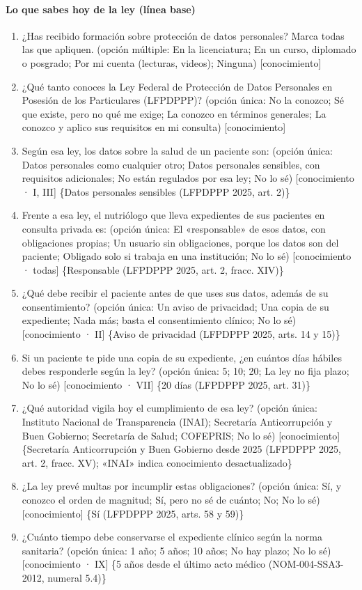 \documentclass[12pt, a4paper]{article}
\begin{document}
\paragraph{Lo que sabes hoy de la ley (línea base)}
\begin{enumerate}
  \item ¿Has recibido formación sobre protección de datos personales? Marca todas las que apliquen. (opción múltiple: En la licenciatura; En un curso, diplomado o posgrado; Por mi cuenta (lecturas, videos); Ninguna) [conocimiento]
  \item ¿Qué tanto conoces la Ley Federal de Protección de Datos Personales en Posesión de los Particulares (LFPDPPP)? (opción única: No la conozco; Sé que existe, pero no qué me exige; La conozco en términos generales; La conozco y aplico sus requisitos en mi consulta) [conocimiento]
  \item Según esa ley, los datos sobre la salud de un paciente son: (opción única: Datos personales como cualquier otro; Datos personales sensibles, con requisitos adicionales; No están regulados por esa ley; No lo sé) [conocimiento · I, III] \{Datos personales sensibles (LFPDPPP 2025, art. 2)\}
  \item Frente a esa ley, el nutriólogo que lleva expedientes de sus pacientes en consulta privada es: (opción única: El «responsable» de esos datos, con obligaciones propias; Un usuario sin obligaciones, porque los datos son del paciente; Obligado solo si trabaja en una institución; No lo sé) [conocimiento · todas] \{Responsable (LFPDPPP 2025, art. 2, fracc. XIV)\}
  \item ¿Qué debe recibir el paciente antes de que uses sus datos, además de su consentimiento? (opción única: Un aviso de privacidad; Una copia de su expediente; Nada más; basta el consentimiento clínico; No lo sé) [conocimiento · II] \{Aviso de privacidad (LFPDPPP 2025, arts. 14 y 15)\}
  \item Si un paciente te pide una copia de su expediente, ¿en cuántos días hábiles debes responderle según la ley? (opción única: 5; 10; 20; La ley no fija plazo; No lo sé) [conocimiento · VII] \{20 días (LFPDPPP 2025, art. 31)\}
  \item ¿Qué autoridad vigila hoy el cumplimiento de esa ley? (opción única: Instituto Nacional de Transparencia (INAI); Secretaría Anticorrupción y Buen Gobierno; Secretaría de Salud; COFEPRIS; No lo sé) [conocimiento] \{Secretaría Anticorrupción y Buen Gobierno desde 2025 (LFPDPPP 2025, art. 2, fracc. XV); «INAI» indica conocimiento desactualizado\}
  \item ¿La ley prevé multas por incumplir estas obligaciones? (opción única: Sí, y conozco el orden de magnitud; Sí, pero no sé de cuánto; No; No lo sé) [conocimiento] \{Sí (LFPDPPP 2025, arts. 58 y 59)\}
  \item ¿Cuánto tiempo debe conservarse el expediente clínico según la norma sanitaria? (opción única: 1 año; 5 años; 10 años; No hay plazo; No lo sé) [conocimiento · IX] \{5 años desde el último acto médico (NOM-004-SSA3-2012, numeral 5.4)\}
\end{enumerate}
 
\end{document}
